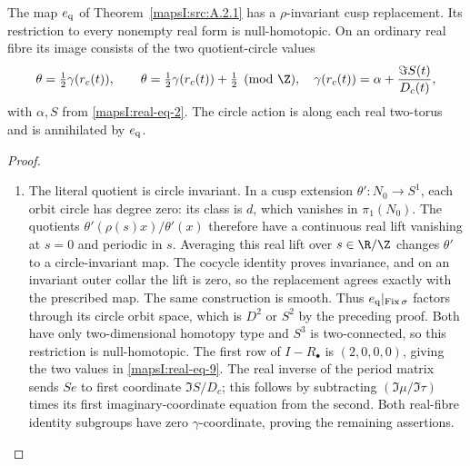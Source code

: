 \begin{proposition}\hypertarget{tag-02PH}{}\label{mapsI:src:A.3.4}

The map $e_{\rm q}$ of Theorem~\ref{mapsI:src:A.2.1} has a $\rho$-invariant
cusp replacement. Its restriction to
every nonempty real form is null-homotopic. On an ordinary real fibre
its image consists of the two quotient-circle values
\[
 \theta=\tfrac12\gamma(r_c(t)),\qquad
 \theta=\tfrac12\gamma(r_c(t))+\tfrac12\pmod\Z,
 \quad
 \gamma(r_c(t))=\alpha+\frac{\Im S(t)}{D_c(t)},
 \label{mapsI:real-eq-9}
\]
with $\alpha,S$ from \eqref{mapsI:real-eq-2}. The circle action is along each real
two-torus and is annihilated by $e_{\rm q}$.
\end{proposition}



\begin{proof}
\begin{enumerate}[label=\arabic*.,leftmargin=*]
\item The literal quotient is circle invariant. In a cusp extension
$\theta':N_0\to S^1$, each orbit circle has degree zero: its class is
$d$, which vanishes in $\pi_1(N_0)$. The quotients
$\theta'(\rho(s)x)/\theta'(x)$ therefore have a continuous real lift
vanishing at $s=0$ and periodic in $s$. Averaging this real lift over
$s\in\R/\Z$ changes $\theta'$ to a circle-invariant map. The cocycle
identity proves invariance, and on an invariant outer collar the lift
is zero, so the replacement agrees exactly with the prescribed map.
The same construction is smooth. Thus $e_{\rm q}|_{\operatorname{Fix}\sigma}$
factors through its circle orbit space, which is $D^2$ or $S^2$ by the
preceding proof. Both have only two-dimensional homotopy type and
$S^3$ is two-connected, so this restriction is null-homotopic.
The first row of $I-R_\bullet$ is $(2,0,0,0)$, giving the two values
in \eqref{mapsI:real-eq-9}. The real inverse of the period matrix sends $S e$ to
first coordinate $\Im S/D_c$; this follows by subtracting
$(\Im\mu/\Im\tau)$ times its first imaginary-coordinate equation
from the second. Both real-fibre identity subgroups have zero
$\gamma$-coordinate, proving the remaining assertions.
\end{enumerate}
\end{proof}





